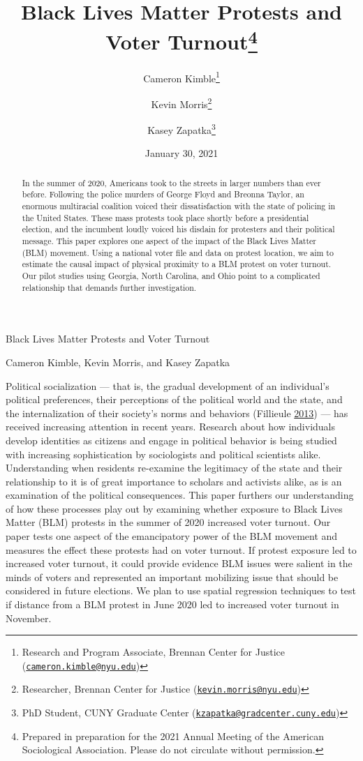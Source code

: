\documentclass[
  12pt,
]{article}
\title{Black Lives Matter Protests and Voter Turnout\thanks{Prepared in preparation for the 2021 Annual Meeting of the American Sociological Association. Please do not circulate without permission.}}
\author{Cameron Kimble\footnote{Research and Program Associate, Brennan Center for Justice (\href{mailto:cameron.kimble@nyu.edu}{\nolinkurl{cameron.kimble@nyu.edu}})} \and Kevin Morris\footnote{Researcher, Brennan Center for Justice (\href{mailto:kevin.morris@nyu.edu}{\nolinkurl{kevin.morris@nyu.edu}})} \and Kasey Zapatka\footnote{PhD Student, CUNY Graduate Center (\href{mailto:kzapatka@gradcenter.cuny.edu}{\nolinkurl{kzapatka@gradcenter.cuny.edu}})}}
\date{January 30, 2021}
\begin{document}
\maketitle
\begin{abstract}
In the summer of 2020, Americans took to the streets in larger numbers than ever before. Following the police murders of George Floyd and Breonna Taylor, an enormous multiracial coalition voiced their dissatisfaction with the state of policing in the United States. These mass protests took place shortly before a presidential election, and the incumbent loudly voiced his disdain for protesters and their political message. This paper explores one aspect of the impact of the Black Lives Matter (BLM) movement. Using a national voter file and data on protest location, we aim to estimate the causal impact of physical proximity to a BLM protest on voter turnout. Our pilot studies using Georgia, North Carolina, and Ohio point to a complicated relationship that demands further investigation.
\end{abstract}

\pagebreak

\begin{center}
Black Lives Matter Protests and Voter Turnout

Cameron Kimble, Kevin Morris, and Kasey Zapatka
\end{center}

Political socialization --- that is, the gradual development of an individual's political preferences, their perceptions of the political world and the state, and the internalization of their society's norms and behaviors (Fillieule \protect\hyperlink{ref-Fillieule2013}{2013}) --- has received increasing attention in recent years. Research about how individuals develop identities as citizens and engage in political behavior is being studied with increasing sophistication by sociologists and political scientists alike. Understanding when residents re-examine the legitimacy of the state and their relationship to it is of great importance to scholars and activists alike, as is an examination of the political consequences. This paper furthers our understanding of how these processes play out by examining whether exposure to Black Lives Matter (BLM) protests in the summer of 2020 increased voter turnout.
Our paper tests one aspect of the emancipatory power of the BLM movement and measures the effect these protests had on voter turnout. If protest exposure led to increased voter turnout, it could provide evidence BLM issues were salient in the minds of voters and represented an important mobilizing issue that should be considered in future elections. We plan to use spatial regression techniques to test if distance from a BLM protest in June 2020 led to increased voter turnout in November.
\end{document}

